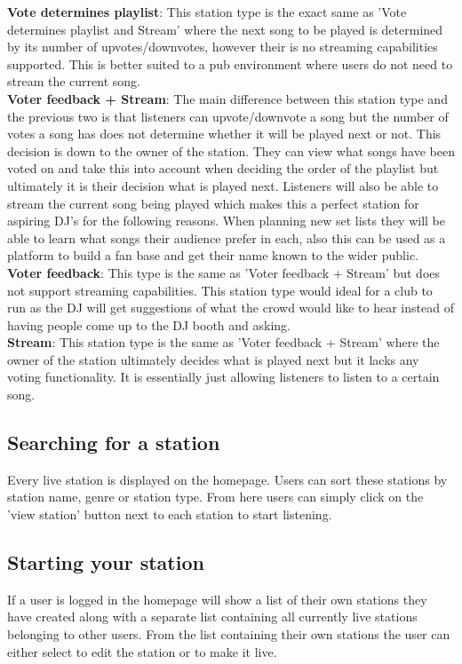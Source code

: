 \documentclass[a4paper, 12pt]{report}
\begin{document}
\textbf{Vote determines playlist}: This station type is the exact same as 'Vote determines playlist and Stream' where the next song to be played is determined by its number of upvotes/downvotes, however their is no streaming capabilities supported. This is better suited to a pub environment where users do not need to stream the current song. \\

\textbf{Voter feedback + Stream}: The main difference between this station type and the previous two is that listeners can upvote/downvote a song but the number of votes a song has does not determine whether it will be played next or not. This decision is down to the owner of the station. They can view what songs have been voted on and take this into account when deciding the order of the playlist but ultimately it is their decision what is played next. 
Listeners will also be able to stream the current song being played which makes this a perfect station for aspiring DJ's for the following reasons. When planning new set lists they will be able to learn what songs their audience prefer in each, also this can be used as a platform to build a fan base and get their name known to the wider public. \\

\textbf{Voter feedback}: This type is the same as 'Voter feedback + Stream' but does not support streaming capabilities. This station type would ideal for a club to run as the DJ will get suggestions of what the crowd would like to hear instead of having people come up to the DJ booth and asking. \\

\textbf{Stream}: This station type is the same as 'Voter feedback + Stream' where the owner of the station ultimately decides what is played next but it lacks any voting functionality. It is essentially just allowing listeners to listen to a certain song. 
 
\subsection{Searching for a station}
Every live station is displayed on the homepage. Users can sort these stations by station name, genre or station type. From here users can simply click on the 'view station' button next to each station to start listening.

\subsection{Starting your station}
If a user is logged in the homepage will show a list of their own stations they have created along with a separate list containing all currently live stations belonging to other users. From the list containing their own stations the user can either select to edit the station or to make it live.
\end{document}
